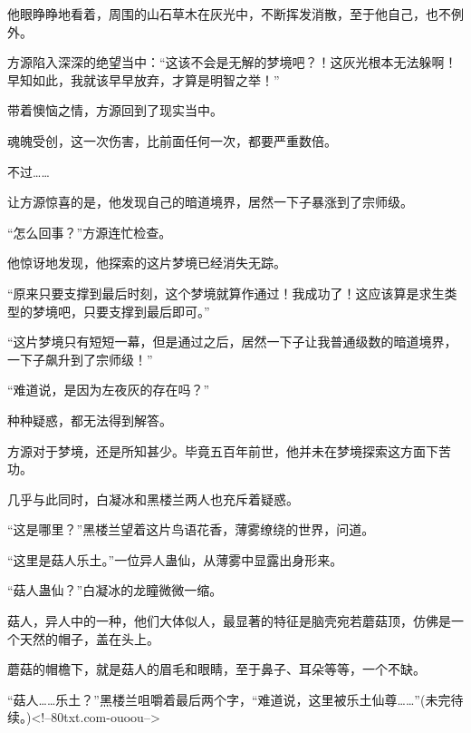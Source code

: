 \begin{this_body}
他眼睁睁地看着，周围的山石草木在灰光中，不断挥发消散，至于他自己，也不例外。

方源陷入深深的绝望当中：“这该不会是无解的梦境吧？！这灰光根本无法躲啊！早知如此，我就该早早放弃，才算是明智之举！”

带着懊恼之情，方源回到了现实当中。

魂魄受创，这一次伤害，比前面任何一次，都要严重数倍。

不过……

让方源惊喜的是，他发现自己的暗道境界，居然一下子暴涨到了宗师级。

“怎么回事？”方源连忙检查。

他惊讶地发现，他探索的这片梦境已经消失无踪。

“原来只要支撑到最后时刻，这个梦境就算作通过！我成功了！这应该算是求生类型的梦境吧，只要支撑到最后即可。”

“这片梦境只有短短一幕，但是通过之后，居然一下子让我普通级数的暗道境界，一下子飙升到了宗师级！”

“难道说，是因为左夜灰的存在吗？”

种种疑惑，都无法得到解答。

方源对于梦境，还是所知甚少。毕竟五百年前世，他并未在梦境探索这方面下苦功。

几乎与此同时，白凝冰和黑楼兰两人也充斥着疑惑。

“这是哪里？”黑楼兰望着这片鸟语花香，薄雾缭绕的世界，问道。

“这里是菇人乐土。”一位异人蛊仙，从薄雾中显露出身形来。

“菇人蛊仙？”白凝冰的龙瞳微微一缩。

菇人，异人中的一种，他们大体似人，最显著的特征是脑壳宛若蘑菇顶，仿佛是一个天然的帽子，盖在头上。

蘑菇的帽檐下，就是菇人的眉毛和眼睛，至于鼻子、耳朵等等，一个不缺。

“菇人……乐土？”黑楼兰咀嚼着最后两个字，“难道说，这里被乐土仙尊……”(未完待续。)<!--80txt.com-ouoou-->

\end{this_body}


